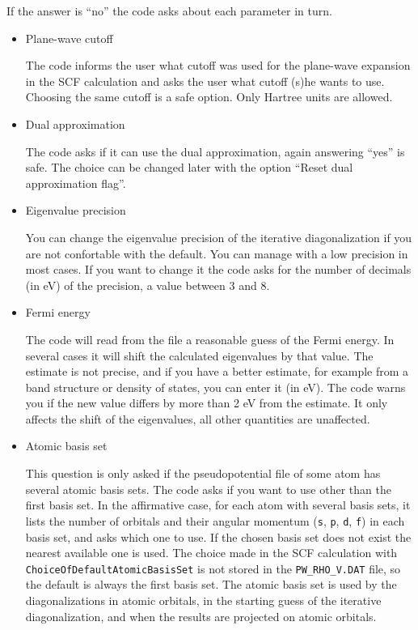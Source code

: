 \documentclass[11pt]{article}
\begin{document}
If the answer is ``no'' the code asks about each parameter in turn.
\begin{itemize}

   \item{Plane-wave cutoff}

   The code informs the user what cutoff was used for the plane-wave expansion
   in the SCF calculation and asks the user what cutoff (s)he wants to use.
   Choosing the same cutoff is a safe option.  Only Hartree units are allowed.

   \item{Dual approximation}

   The code asks if it can use the dual approximation, again answering ``yes'' is safe.
   The choice can be changed later with the option ``Reset dual approximation flag''.

   \item{Eigenvalue precision}

   You can change the eigenvalue precision of the iterative diagonalization
   if you are not confortable with the default.  You can manage with a low
   precision in most cases.  If you want to change it the code asks for the number of
   decimals (in eV) of the precision, a value between 3 and 8.

   \item{Fermi energy}

   The code will read from the file a reasonable guess of the Fermi energy.
   In several cases it will shift the calculated eigenvalues by that value.
   The estimate is not precise, and if you have a better
   estimate, for example from a band structure or density of states, you can enter it (in eV).
   The code warns you if the new value differs by more than 2 eV from the estimate.
   It only affects the shift of the eigenvalues, all other quantities are unaffected.

   \item{Atomic basis set}

   This question is only asked if the pseudopotential file of some atom has several
   atomic basis sets.  The code asks if you want to use other than the first basis set.
   In the affirmative case, for each atom with several basis sets, it lists
   the number of orbitals and their angular momentum
   (\texttt{s}, \texttt{p}, \texttt{d}, \texttt{f}) in each basis set,
   and asks which one to use.  If the chosen basis set does not exist the nearest
   available one is used.
   The choice made in the SCF calculation with \texttt{ChoiceOfDefaultAtomicBasisSet}
   is not stored in the \texttt{PW\_RHO\_V.DAT} file, so the default is always
   the first basis set.  The atomic basis set is used by the diagonalizations in atomic orbitals,
   in the starting guess of the iterative diagonalization, and when the results are
   projected on atomic orbitals.

\end{itemize}
\end{document}

